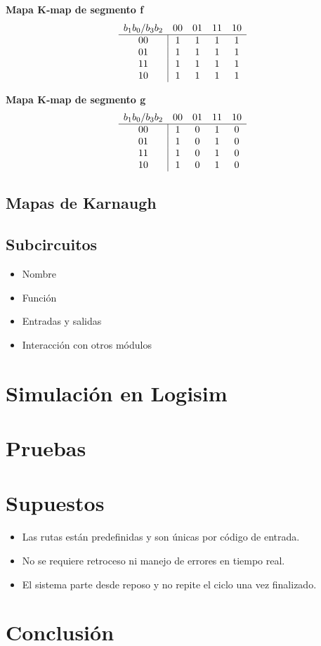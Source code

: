 \documentclass[12pt]{article}
\begin{document}
\noindent
\textbf{Mapa K‐map de segmento \textsf{f}}  
\[
\begin{array}{c|cccc}
\multicolumn{1}{c}{b_1b_0/b_3b_2} & \multicolumn{1}{c}{00} & \multicolumn{1}{c}{01} & \multicolumn{1}{c}{11} & \multicolumn{1}{c}{10} \\
\hline
00 & 1 & 1 & 1 & 1 \\
01       & 1 & 1 & 1 & 1 \\
11       & 1 & 1 & 1 & 1 \\
10       & 1 & 1 & 1 & 1 \\
\end{array}
\]
\vspace{1em}

\noindent
\textbf{Mapa K‐map de segmento \textsf{g}}  
\[
\begin{array}{c|cccc}
\multicolumn{1}{c}{b_1b_0/b_3b_2} & \multicolumn{1}{c}{00} & \multicolumn{1}{c}{01} & \multicolumn{1}{c}{11} & \multicolumn{1}{c}{10} \\
\hline
00 & 1 & 0 & 1 & 0 \\
01       & 1 & 0 & 1 & 0 \\
11       & 1 & 0 & 1 & 0 \\
10       & 1 & 0 & 1 & 0 \\
\end{array}
\]
\vspace{1em}

\noindent

\subsection{Mapas de Karnaugh}

\subsection{Subcircuitos}

\begin{itemize}
    \item Nombre
    \item Función
    \item Entradas y salidas
    \item Interacción con otros módulos
\end{itemize}

\section{Simulación en Logisim}

\section{Pruebas}

\section{Supuestos}
\begin{itemize}
    \item Las rutas están predefinidas y son únicas por código de entrada.
    \item No se requiere retroceso ni manejo de errores en tiempo real.
    \item El sistema parte desde reposo y no repite el ciclo una vez finalizado.
\end{itemize}

\section{Conclusión}
\end{document}
